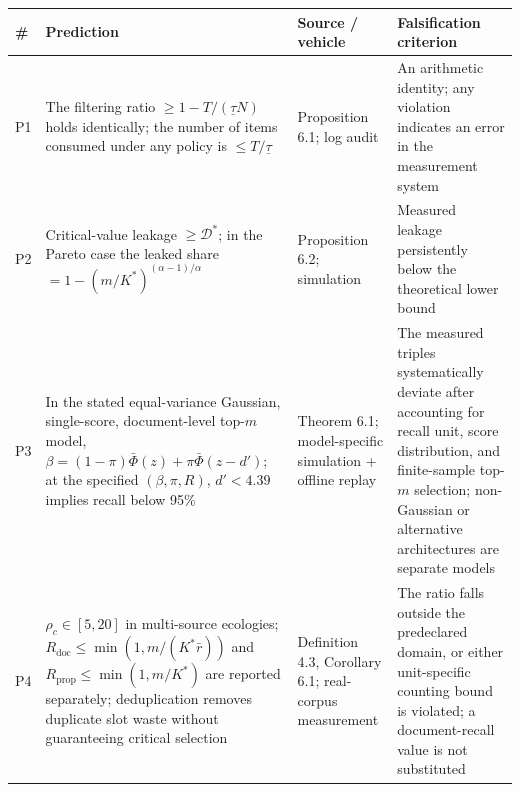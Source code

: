 \documentclass[
  11pt]{article}
\begin{document}
\begin{longtable}[]{@{}
  >{\raggedright\arraybackslash}p{}
  >{\raggedright\arraybackslash}p{}
  >{\raggedright\arraybackslash}p{}
  >{\raggedright\arraybackslash}p{}@{}}
\toprule\noalign{}
\begin{minipage}[b]{\linewidth}\raggedright
\#
\end{minipage} & \begin{minipage}[b]{\linewidth}\raggedright
Prediction
\end{minipage} & \begin{minipage}[b]{\linewidth}\raggedright
Source / vehicle
\end{minipage} & \begin{minipage}[b]{\linewidth}\raggedright
Falsification criterion
\end{minipage} \\
\midrule\noalign{}
\endhead
\bottomrule\noalign{}
\endlastfoot
P1 & The filtering ratio \(\ge 1 - T/(\underline\tau N)\) holds
identically; the number of items consumed under any policy is
\(\le T/\underline\tau\) & Proposition 6.1; log audit & An arithmetic
identity; any violation indicates an error in the measurement system \\
P2 & Critical-value leakage \(\ge \mathcal{D}^*\); in the Pareto case
the leaked share \(= 1-(m/K^*)^{(\alpha-1)/\alpha}\) & Proposition 6.2;
simulation & Measured leakage persistently below the theoretical lower
bound \\
P3 & In the stated equal-variance Gaussian, single-score, document-level
top-\(m\) model, \(\beta=(1-\pi)\bar\Phi(z)+\pi\bar\Phi(z-d')\); at the
specified \((\beta,\pi,R)\), \(d'<4.39\) implies recall below 95\% &
Theorem 6.1; model-specific simulation + offline replay & The measured
triples systematically deviate after accounting for recall unit, score
distribution, and finite-sample top-\(m\) selection; non-Gaussian or
alternative architectures are separate models \\
P4 & \(\rho_c\in[5,20]\) in multi-source ecologies;
\(R_{\mathrm{doc}}\le\min(1,m/(K^*\bar r))\) and
\(R_{\mathrm{prop}}\le\min(1,m/K^*)\) are reported separately;
deduplication removes duplicate slot waste without guaranteeing critical
selection & Definition 4.3, Corollary 6.1; real-corpus measurement & The
ratio falls outside the predeclared domain, or either unit-specific
counting bound is violated; a document-recall value is not substituted

\end{longtable}
\end{document}

